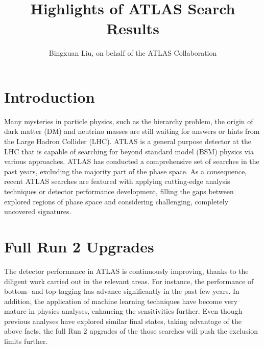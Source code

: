 \documentclass{moriond}
\begin{document}
\title{Highlights of ATLAS Search Results}

\author{Bingxuan Liu, on behalf of the ATLAS Collaboration}

\address{Department of Physics, Simon Fraser University, Vancouver, Canada}

\maketitle{}  

\section{Introduction}

Many mysteries in particle physics, such as the hierarchy problem, the origin
of dark matter (DM) and neutrino masses are still waiting for answers or hints
from the Large Hadron Collider (LHC). ATLAS is a general purpose detector at
the LHC that is capable of searching for beyond standard model (BSM) physics
via various approaches. ATLAS has conducted a comprehensive set of searches in
the past years, excluding the majority part of the phase space. As a
consequence, recent ATLAS searches are featured with applying cutting-edge
analysis techniques or detector performance development, filling the gaps
between explored regions of phase space and considering challenging, completely
uncovered signatures.      

\section{Full Run 2 Upgrades}

The detector performance in ATLAS is continuously improving, thanks to the
diligent work carried out in the relevant areas. For instance, the performance
of bottom- and top-tagging has advance significantly in the past few years. In
addition, the application of machine learning techniques have become very
mature in physics analyses, enhancing the sensitivities further. Even though
previous analyses have explored similar final states, taking advantage of the
above facts, the full Run 2 upgrades of the those searches will push the
exclusion limits further.\\
\end{document}
